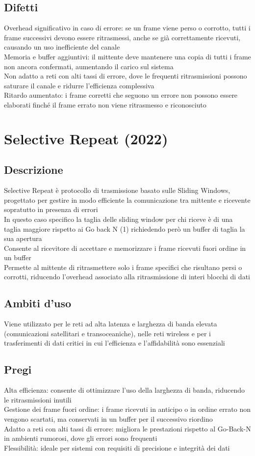 \documentclass[10pt,oneside,a4paper]{article}
\begin{document}
\subsection{Difetti}
Overhead significativo in caso di errore: se un frame viene perso o corrotto, tutti i frame successivi devono essere ritrasmessi, anche se già correttamente ricevuti, causando un uso inefficiente del canale\\
Memoria e buffer aggiuntivi: il mittente deve mantenere una copia di tutti i frame non ancora confermati, aumentando il carico sul sistema\\
Non adatto a reti con alti tassi di errore, dove le frequenti ritrasmissioni possono saturare il canale e ridurre l'efficienza complessiva\\
Ritardo aumentato: i frame corretti che seguono un errore non possono essere elaborati finché il frame errato non viene ritrasmesso e riconosciuto
\section{Selective Repeat (2022)}
\subsection{Descrizione}
Selective Repeat è protocollo di trasmissione basato sulle Sliding Windows, progettato per gestire in modo efficiente la comunicazione tra mittente e ricevente sopratutto in presenza di errori\\
In questo caso specifico la taglia delle sliding window per chi riceve è di una taglia maggiore rispetto ai Go back N (1) richiedendo però un buffer di taglia la sua apertura\\
Consente al ricevitore di accettare e memorizzare i frame ricevuti fuori ordine in un buffer\\
Permette al mittente di ritrasmettere solo i frame specifici che risultano persi o corrotti, riducendo l'overhead associato alla ritrasmissione di interi blocchi di dati
\subsection{Ambiti d'uso}
Viene utilizzato per le reti ad alta latenza e larghezza di banda elevata (comunicazioni satellitari e transoceaniche), nelle reti wireless e per i trasferimenti di dati critici in cui l'efficienza e l'affidabilità sono essenziali
\subsection{Pregi}
Alta efficienza: consente di ottimizzare l'uso della larghezza di banda, riducendo le ritrasmissioni inutili\\
Gestione dei frame fuori ordine: i frame ricevuti in anticipo o in ordine errato non vengono scartati, ma conservati in un buffer per il successivo riordino\\
Adatto a reti con alti tassi di errore: migliora le prestazioni rispetto al Go-Back-N in ambienti rumorosi, dove gli errori sono frequenti\\
Flessibilità: ideale per sistemi con requisiti di precisione e integrità dei dati
\end{document}
